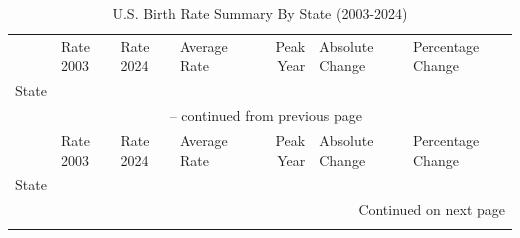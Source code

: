 \begin{longtable}{llllrll}
\caption{U.S. Birth Rate Summary By State (2003-2024)} 
\label{tab:birth_rate_summary} \\

\toprule
 & Rate 2003 & Rate 2024 & Average Rate & Peak Year & Absolute Change & Percentage Change \\
State &  &  &  &  &  &  \\
\midrule
\endfirsthead

\multicolumn{7}{c}{{\tablename\ \thetable{} -- continued from previous page}} \\
\toprule
 & Rate 2003 & Rate 2024 & Average Rate & Peak Year & Absolute Change & Percentage Change \\
State &  &  &  &  &  &  \\
\midrule
\endhead

\midrule
\multicolumn{7}{r}{{Continued on next page}} \\
\endfoot

\bottomrule
\endlastfoot


\end{longtable}
